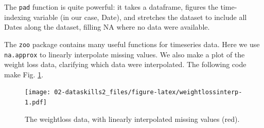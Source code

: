 \documentclass[]{book}
\newenvironment{Shaded}{\begin{snugshade}}{\end{snugshade}}
\newcommand{\CommentTok}[1]{\textcolor[rgb]{0.56,0.35,0.01}{\textit{#1}}}
\newcommand{\DataTypeTok}[1]{\textcolor[rgb]{0.13,0.29,0.53}{#1}}
\newcommand{\FloatTok}[1]{\textcolor[rgb]{0.00,0.00,0.81}{#1}}
\newcommand{\KeywordTok}[1]{\textcolor[rgb]{0.13,0.29,0.53}{\textbf{#1}}}
\newcommand{\NormalTok}[1]{#1}
\newcommand{\OperatorTok}[1]{\textcolor[rgb]{0.81,0.36,0.00}{\textbf{#1}}}
\newcommand{\StringTok}[1]{\textcolor[rgb]{0.31,0.60,0.02}{#1}}
\begin{document}
The \texttt{pad} function is quite powerful: it takes a dataframe, figures the time-indexing variable (in our case, Date), and stretches the dataset to include all Dates along the dataset, filling NA where no data were available.

The \texttt{zoo} package contains many useful functions for timeseries data. Here we use \texttt{na.approx} to linearly interpolate missing values. We also make a plot of the weight loss data, clarifying which data were interpolated. The following code make Fig. \ref{fig:weightlossinterp}.

\begin{Shaded}
\end{Shaded}

\begin{figure}
\centering
\texttt{[image: 02-dataskills2\_files/figure-latex/weightlossinterp-1.pdf]}
\caption{\label{fig:weightlossinterp}The weightloss data, with linearly interpolated missing values (red).}
\end{figure}
\end{document}

